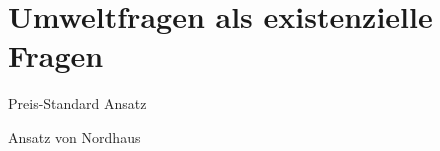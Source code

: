 %
%
%

\chapter{Umweltfragen als existenzielle Fragen}
\label{Umwelt}

Preis-Standard Ansatz

Ansatz von Nordhaus





